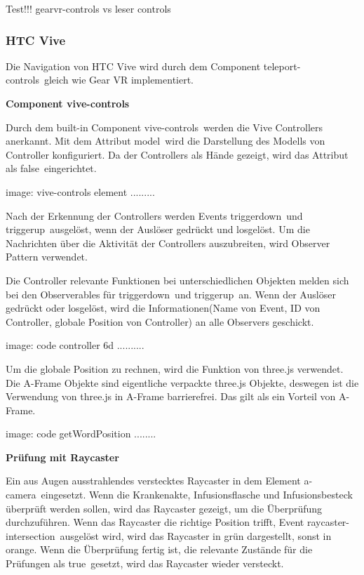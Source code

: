   Test!!! gearvr-controls vs leser controls
  
  \subsubsection{HTC Vive}
  
  Die Navigation von HTC Vive wird durch dem Component \glqq teleport-controls\grqq\ gleich wie Gear VR implementiert.
  
  \textbf{Component vive-controls}
  
  Durch dem built-in Component \glqq vive-controls\grqq\ werden die Vive Controllers anerkannt. Mit dem Attribut \glqq model\grqq\ wird die Darstellung des Modells von Controller konfiguriert. Da der Controllers als Hände gezeigt, wird das Attribut als \glqq false\grqq\ eingerichtet.
  
  image: vive-controls element .........
  
  Nach der Erkennung der Controllers werden Events \glqq triggerdown\grqq\ und \glqq triggerup\grqq\ ausgelöst, wenn der Auslöser gedrückt und losgelöst. Um die Nachrichten über die Aktivität der Controllers auszubreiten, wird Observer Pattern verwendet.
  
  Die Controller relevante Funktionen bei unterschiedlichen Objekten melden sich bei den Observerables für \glqq triggerdown\grqq\ und \glqq triggerup\grqq\ an. Wenn der Auslöser gedrückt oder losgelöst, wird die Informationen(Name von Event, ID von Controller, globale Position von Controller) an alle Observers geschickt.
  
  image: code controller 6d ..........
  
  Um die globale Position zu rechnen, wird die Funktion von three.js verwendet. Die A-Frame Objekte sind eigentliche verpackte three.js Objekte, deswegen ist die Verwendung von three.js in A-Frame barrierefrei. Das gilt als ein Vorteil von A-Frame.
  
  image: code getWordPosition ........
  
  \textbf{Prüfung mit Raycaster}
  
  Ein aus Augen ausstrahlendes verstecktes Raycaster in dem Element \glqq a-camera\grqq\ eingesetzt. Wenn die Krankenakte, Infusionsflasche und Infusionsbesteck überprüft werden sollen, wird das Raycaster gezeigt, um die Überprüfung durchzuführen. Wenn das Raycaster die richtige Position trifft, Event \glqq raycaster-intersection\grqq\ ausgelöst wird, wird das Raycaster in grün dargestellt, sonst in orange. Wenn die Überprüfung fertig ist, die relevante Zustände für die Prüfungen als \glqq true\grqq\ gesetzt, wird das Raycaster wieder versteckt.
  
